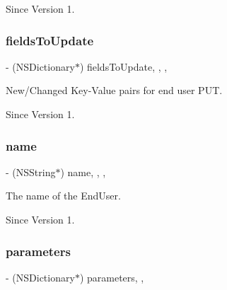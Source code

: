 \begin{DoxySince}{Since}
Version 1. 
\end{DoxySince}
\hypertarget{class_x_i_end_user_info_a511da2c1ab0e1f4f83bafdbff246da6b}{}\label{class_x_i_end_user_info_a511da2c1ab0e1f4f83bafdbff246da6b} 
\subsubsection{\texorpdfstring{fields\+To\+Update}{fieldsToUpdate}}
{\footnotesize\ttfamily -\/ (N\+S\+Dictionary$\ast$) fields\+To\+Update\hspace{0.3cm}{\ttfamily [read]}, {\ttfamily [write]}, {\ttfamily [nonatomic]}, {\ttfamily [assign]}}



New/\+Changed Key-\/\+Value pairs for end user P\+UT. 

\begin{DoxySince}{Since}
Version 1. 
\end{DoxySince}
\hypertarget{class_x_i_end_user_info_a24a1bd487185ee783d4572de4f2759d2}{}\label{class_x_i_end_user_info_a24a1bd487185ee783d4572de4f2759d2} 
\subsubsection{\texorpdfstring{name}{name}}
{\footnotesize\ttfamily -\/ (N\+S\+String$\ast$) name\hspace{0.3cm}{\ttfamily [read]}, {\ttfamily [write]}, {\ttfamily [nonatomic]}, {\ttfamily [assign]}}



The name of the End\+User. 

\begin{DoxySince}{Since}
Version 1. 
\end{DoxySince}
\hypertarget{class_x_i_end_user_info_a8c637fed226db0eba6ded513a9cb6752}{}\label{class_x_i_end_user_info_a8c637fed226db0eba6ded513a9cb6752} 
\subsubsection{\texorpdfstring{parameters}{parameters}}
{\footnotesize\ttfamily -\/ (N\+S\+Dictionary$\ast$) parameters\hspace{0.3cm}{\ttfamily [read]}, {\ttfamily [nonatomic]}, {\ttfamily [assign]}}



